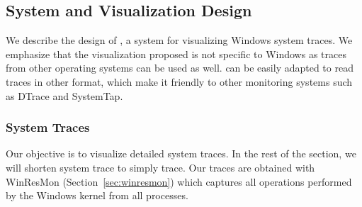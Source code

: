 \subsection{System and Visualization Design}


We describe the design of , a system for visualizing Windows system
traces.
We emphasize that the visualization proposed
is not specific to Windows as traces from other operating systems
can be used as well.
 can be easily adapted to read traces in other format,
which make it friendly to other monitoring systems such as DTrace
and SystemTap.

\subsubsection{System Traces}
\label{sec:systrace}

Our objective is to visualize detailed system traces.
In the rest of the section, we will shorten system trace to simply trace.
Our traces are obtained with WinResMon (Section~\ref{sec:winresmon}) which
captures all operations performed by the Windows kernel
from all processes.

